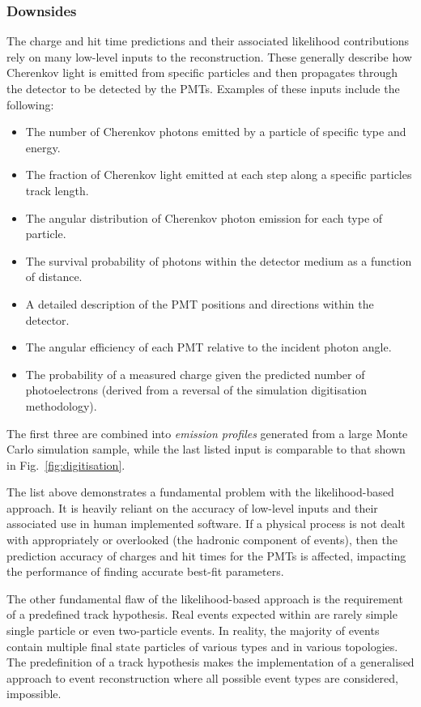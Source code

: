 \subsubsection*{Downsides} %

The charge and hit time predictions and their associated likelihood contributions rely on many
low-level inputs to the reconstruction. These generally describe how Cherenkov light is emitted
from specific particles and then propagates through the detector to be detected by the PMTs.
Examples of these inputs include the following:
\begin{itemize}
    \item The number of Cherenkov photons emitted by a particle of specific type and energy.
    \item The fraction of Cherenkov light emitted at each step along a specific particles track
          length.
    \item The angular distribution of Cherenkov photon emission for each type of particle.
    \item The survival probability of photons within the detector medium as a function of
          distance.
    \item A detailed description of the PMT positions and directions within the detector.
    \item The angular efficiency of each PMT relative to the incident photon angle.
    \item The probability of a measured charge given the predicted number of photoelectrons
          (derived from a reversal of the simulation digitisation methodology).
\end{itemize}
The first three are combined into \emph{emission profiles} generated from a large Monte Carlo
simulation sample, while the last listed input is comparable to that shown in
Fig.~\ref{fig:digitisation}.

The list above demonstrates a fundamental problem with the likelihood-based approach. It is
heavily reliant on the accuracy of low-level inputs and their associated use in human implemented
software. If a physical process is not dealt with appropriately or overlooked (the hadronic
component of events), then the prediction accuracy of charges and hit times for the PMTs is
affected, impacting the performance of finding accurate best-fit parameters.

The other fundamental flaw of the likelihood-based approach is the requirement of a predefined
track hypothesis. Real events expected within \chips are rarely simple single particle or even
two-particle events. In reality, the majority of events contain multiple final state particles of
various types and in various topologies. The predefinition of a track hypothesis makes the
implementation of a generalised approach to event reconstruction where all possible event types
are considered, impossible.

